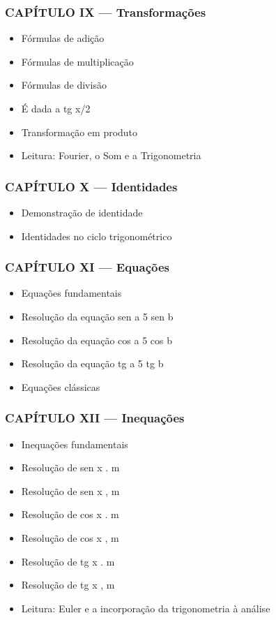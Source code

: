 \documentclass[a4paper,12pt]{article}[abntex2]
\begin{document}
\subsubsection*{CAPÍTULO IX — Transformações}

\begin{itemize}
\item Fórmulas de adição
\item Fórmulas de multiplicação
\item Fórmulas de divisão
\item É dada a tg x/2
\item Transformação em produto
\item Leitura: Fourier, o Som e a Trigonometria
\end{itemize}
\subsubsection*{CAPÍTULO X — Identidades}

\begin{itemize}
\item Demonstração de identidade
\item Identidades no ciclo trigonométrico
\end{itemize}
\subsubsection*{CAPÍTULO XI — Equações}

\begin{itemize}
\item Equações fundamentais
\item Resolução da equação sen a 5 sen b
\item Resolução da equação cos a 5 cos b
\item Resolução da equação tg a 5 tg b
\item Equações clássicas
\end{itemize}
\subsubsection*{CAPÍTULO XII — Inequações}

\begin{itemize}
\item Inequações fundamentais
\item Resolução de sen x . m
\item Resolução de sen x , m
\item Resolução de cos x . m
\item Resolução de cos x , m
\item Resolução de tg x . m
\item Resolução de tg x , m
\item Leitura: Euler e a incorporação da trigonometria à análise
\end{itemize}
\end{document}
